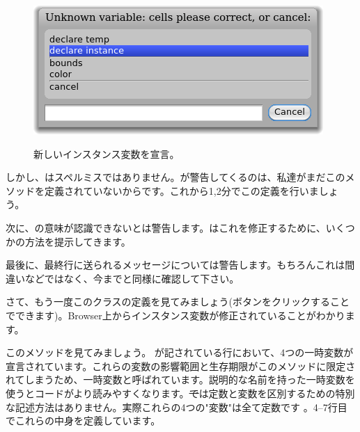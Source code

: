 \documentclass[a4paper,10pt,twoside]{book}
\begin{document}
\begin{figure}[htb]
\begin{minipage}{0.48\textwidth}
		{\includegraphics[scale=0.7]{DeclareInstanceVar}}
	\caption{新しいインスタンス変数を宣言。}
\end{minipage}
\end{figure}

しかし、はスペルミスではありません。\pharo が警告してくるのは、私達がまだこのメソッドを定義されていないからです。これから1,2分でこの定義を行いましょう。


次に、の意味が認識できないと\pharo は警告します。\pharo はこれを修正するために、いくつかの方法を提示してきます。

最後に、最終行に送られるメッセージについて\pharo は警告します。もちろんこれは間違いなどではなく、今までと同様に確認して下さい。

さて、もう一度このクラスの定義を見てみましょう(ボタンをクリックすることでできます)。Browser上からインスタンス変数が修正されていることがわかります。

このメソッドを見てみましょう。
が記されている行において、4つの一時変数が宣言されています。これらの変数の影響範囲と生存期限がこのメソッドに限定されてしまうため、一時変数と呼ばれています。説明的な名前を持った一時変数を使うとコードがより読みやすくなります。\st では定数と変数を区別するための特別な記述方法はありません。実際これらの4つの"変数"は全て定数です
。4--7行目でこれらの中身を定義しています。
\end{document}
